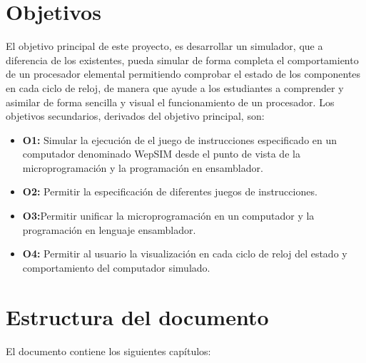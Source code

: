 \section{Objetivos}
\label{sec:objectives}

El objetivo principal de este proyecto, es desarrollar un simulador, que a diferencia de los existentes, pueda simular de forma completa el comportamiento de un procesador elemental permitiendo comprobar el estado de los componentes en cada ciclo de reloj, de manera que ayude a los estudiantes a comprender y asimilar de forma sencilla y visual el funcionamiento de un procesador. Los objetivos secundarios, derivados del objetivo principal, son:

\begin{itemize}

\item \textbf{O1:} Simular la ejecución de el juego de instrucciones especificado en un computador denominado WepSIM desde el punto de vista de la microprogramación y la programación en ensamblador.

\item \textbf{O2:} Permitir la especificación de diferentes juegos de instrucciones.

\item \textbf{O3:}Permitir unificar la microprogramación en un computador y la programación en lenguaje ensamblador.

\item \textbf{O4:} Permitir al usuario la visualización en cada ciclo de reloj del estado y comportamiento del computador simulado.

\end{itemize}

\section{Estructura del documento}
\label{sec:document_structure}

El documento contiene los siguientes capítulos:


